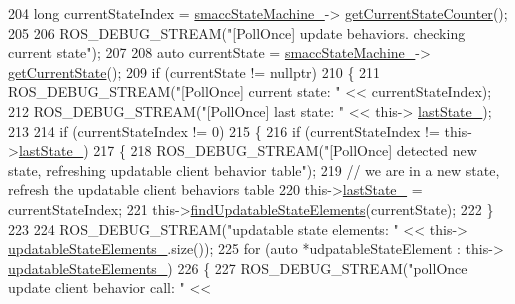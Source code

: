 \begin{DoxyCode}
204                 \textcolor{keywordtype}{long} currentStateIndex = \hyperlink{classsmacc_1_1SignalDetector_a46025de6ac7b5980e22144f9703236a4}{smaccStateMachine\_}->
      \hyperlink{classsmacc_1_1ISmaccStateMachine_aad27c0182b53245d0aded22e63cd83bd}{getCurrentStateCounter}();
205 
206                 ROS\_DEBUG\_STREAM(\textcolor{stringliteral}{"[PollOnce] update behaviors. checking current state"});
207 
208                 \textcolor{keyword}{auto} currentState = \hyperlink{classsmacc_1_1SignalDetector_a46025de6ac7b5980e22144f9703236a4}{smaccStateMachine\_}->
      \hyperlink{classsmacc_1_1ISmaccStateMachine_a610d09dc5341fb63732be713c21fbe86}{getCurrentState}();
209                 \textcolor{keywordflow}{if} (currentState != \textcolor{keyword}{nullptr})
210                 \{
211                     ROS\_DEBUG\_STREAM(\textcolor{stringliteral}{"[PollOnce] current state: "} << currentStateIndex);
212                     ROS\_DEBUG\_STREAM(\textcolor{stringliteral}{"[PollOnce] last state: "} << this->
      \hyperlink{classsmacc_1_1SignalDetector_a72293ed0e98f4200fbe75b53f1e41eab}{lastState\_});
213 
214                     \textcolor{keywordflow}{if} (currentStateIndex != 0)
215                     \{
216                         \textcolor{keywordflow}{if} (currentStateIndex != this->\hyperlink{classsmacc_1_1SignalDetector_a72293ed0e98f4200fbe75b53f1e41eab}{lastState\_})
217                         \{
218                             ROS\_DEBUG\_STREAM(\textcolor{stringliteral}{"[PollOnce] detected new state, refreshing updatable client
       behavior table"});
219                             \textcolor{comment}{// we are in a new state, refresh the updatable client behaviors table}
220                             this->\hyperlink{classsmacc_1_1SignalDetector_a72293ed0e98f4200fbe75b53f1e41eab}{lastState\_} = currentStateIndex;
221                             this->\hyperlink{classsmacc_1_1SignalDetector_a443234ebdf8cedd45cde725e64639dfe}{findUpdatableStateElements}(currentState);
222                         \}
223 
224                         ROS\_DEBUG\_STREAM(\textcolor{stringliteral}{"updatable state elements: "} << this->
      \hyperlink{classsmacc_1_1SignalDetector_a07a5e7bb00c348435d954e22682fa610}{updatableStateElements\_}.size());
225                         \textcolor{keywordflow}{for} (\textcolor{keyword}{auto} *udpatableStateElement : this->
      \hyperlink{classsmacc_1_1SignalDetector_a07a5e7bb00c348435d954e22682fa610}{updatableStateElements\_})
226                         \{
227                             ROS\_DEBUG\_STREAM(\textcolor{stringliteral}{"pollOnce update client behavior call: "} << 

\end{DoxyCode}
